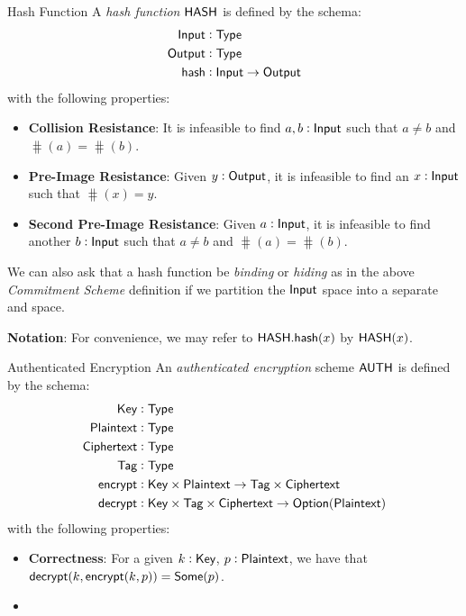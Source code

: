 \begin{definitiontoc}{Hash Function}
    A \emph{hash function} ${\textsf{HASH}}$ is defined by the schema:
    \begin{align*}
        {\textsf{Input}}  &: {\textsf{Type}} \\
        {\textsf{Output}} &: {\textsf{Type}} \\
        {\textsf{hash}}   &: {\textsf{Input}} \to {\textsf{Output}}
    \end{align*}
    with the following properties:
    \begin{itemize}
        \item \textbf{Collision Resistance}: It is infeasible to find $a, b : {\textsf{Input}}$ such that $a \ne b$ and $\hash(a) = \hash(b)$.
        \item \textbf{Pre-Image Resistance}: Given $y : {\textsf{Output}}$, it is infeasible to find an $x : {\textsf{Input}}$ such that $\hash(x) = y$.
        \item \textbf{Second Pre-Image Resistance}: Given $a : {\textsf{Input}}$, it is infeasible to find another $b : {\textsf{Input}}$ such that $a \ne b$ and $\hash(a) = \hash(b)$.
    \end{itemize}

    We can also ask that a hash function be \emph{binding} or \emph{hiding} as in the above \emph{Commitment Scheme} definition if we partition the ${\textsf{Input}}$ space into a separate \Randomness{} and \Input{} space.

    \textbf{Notation}: For convenience, we may refer to ${\textsf{HASH}}.{\textsf{hash}}(x)$ by ${\textsf{HASH}}(x)$.
\end{definitiontoc}

\begin{definitiontoc}{Authenticated Encryption}
    An \emph{authenticated encryption} scheme ${\textsf{AUTH}}$ is defined by the schema:
    \begin{align*}
        {\textsf{Key}}        &: {\textsf{Type}} \\
        {\textsf{Plaintext}}  &: {\textsf{Type}} \\
        {\textsf{Ciphertext}} &: {\textsf{Type}} \\
        {\textsf{Tag}}        &: {\textsf{Type}} \\
        {\textsf{encrypt}}    &: {\textsf{Key}} \times {\textsf{Plaintext}} \to {\textsf{Tag}} \times {\textsf{Ciphertext}} \\
        {\textsf{decrypt}}    &: {\textsf{Key}} \times {\textsf{Tag}} \times {\textsf{Ciphertext}} \to {\textsf{Option}}({\textsf{Plaintext}})
    \end{align*}
    with the following properties:
    \begin{itemize}
        \item \textbf{Correctness}: For a given $k : {\textsf{Key}}$, $p : {\textsf{Plaintext}}$, we have that ${\textsf{decrypt}}(k, {\textsf{encrypt}}(k, p)) = {\textsf{Some}}(p)$.
        \item {}
    \end{itemize}
\end{definitiontoc}

